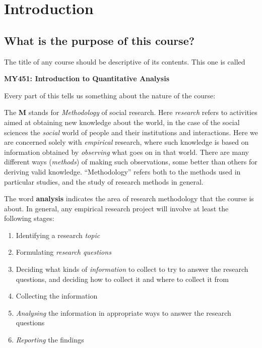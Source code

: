 \chapter{Introduction}
\label{c_intro}


\section{What is the purpose of this course?}
\label{s_intro_purpose}

%
The title of any course should be descriptive of its contents.
This one is called
\begin{center}
\textbf{MY451: Introduction to Quantitative Analysis}
\end{center}
Every part of this tells us something about the nature of the
course:

The \textbf{M} stands for \emph{Methodology} of social research. Here
\emph{research} refers to activities aimed at obtaining new knowledge
about the world, in the case of the social sciences the \emph{social}
world of people and their institutions and interactions. Here we are
concerned solely with \emph{empirical} research, where such knowledge is
based on information obtained by \emph{observing} what goes on in that
world. There are many different ways (\emph{methods}) of making such
observations, some better than others for deriving valid knowledge.
``Methodology'' refers both to the methods used in particular studies,
and the study of research methods in general.

The word \textbf{analysis} indicates the area of research methodology
that the course is about. In general, any empirical research project
will involve at least the following stages:
\begin{enumerate}
\item
Identifying a research \emph{topic}
\item
Formulating \emph{research questions}
\item
Deciding what kinds of \emph{information} to collect to try to answer the
research questions, and deciding how to collect it and where to collect
it from
\item
Collecting the information
\item
\emph{Analysing} the information in appropriate ways to answer the
research questions
\item
\emph{Reporting} the findings
\end{enumerate}

